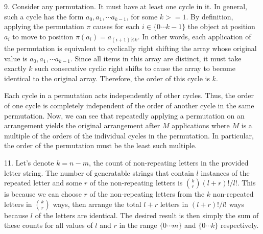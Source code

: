 \documentclass{article}
\begin{document}
9. Consider any permutation. It must have at least one cycle in it. In general, such a cycle has the form $a_0, a_1, \cdots a_{k - 1}$, for some $k >= 1$. By definition, applying the permutation $\pi$ causes for each $i \in \{0 \cdots k - 1\}$ the object at position $a_i$ to move to position $\pi(a_i) = a_{(i + 1) \% k}$. In other words, each application of the permutation is equivalent to cyclically right shifting the array whose original value is $a_0, a_1, \cdots a_{k - 1}$. Since all items in this array are distinct, it must take exactly $k$ such consecutive cyclic right shifts to cause the array to become identical to the original array. Therefore, the order of this cycle is $k$.

Each cycle in a permutation acts independently of other cycles. Thus, the order of one cycle is completely independent of the order of another cycle in the same permutation. Now, we can see that repeatedly applying a permutation on an arrangement yields the original arrangement after $M$ applications where $M$ is a multiple of the orders of the individual cycles in the permutation. In particular, the order of the permutation must be the least such multiple. 

11. Let's denote $k = n - m$, the count of non-repeating letters in the provided letter string. The number of generatable strings that contain $l$ instances of the repeated letter and some $r$ of the non-repeating letters is ${k \choose r} (l + r)! / l!$. This is because we can choose $r$ of the non-repeating letters from the $k$ non-repeated letters in $k \choose r$ ways, then arrange the total $l + r$ letters in $(l + r)! / l!$ ways because $l$ of the letters are identical. The desired result is then simply the sum of these counts for all values of $l$ and $r$ in the range $\{0 \cdots m\}$ and $\{0 \cdots k\}$ respectively.
\end{document}
